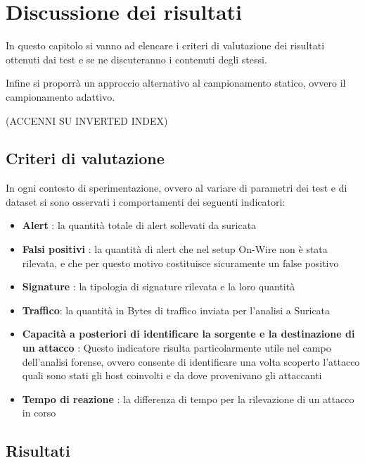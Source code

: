 \documentclass[12pt,a4paper,openright,twoside]{report}
\begin{document}
\chapter{Discussione dei risultati}                %
\lhead[\fancyplain{}{\bfseries\thepage}]{\fancyplain{}{\bfseries\rightmark}}

In questo capitolo si vanno ad elencare i criteri di valutazione dei risultati
ottenuti dai test e se ne discuteranno i contenuti degli stessi.

Infine si proporr\`a un approccio alternativo al campionamento statico, ovvero
il campionamento adattivo.

(ACCENNI SU INVERTED INDEX)

\section{Criteri di valutazione}
In ogni contesto di sperimentazione, ovvero al variare di parametri dei test e di
dataset si sono osservati i comportamenti dei seguenti indicatori:
\begin{itemize}
  \item {\bf Alert} : la quantit\`a totale di alert sollevati da suricata
  \item {\bf Falsi positivi} : la quantit\`a di alert che nel setup On-Wire
  non \`e stata rilevata, e che per questo motivo costituisce sicuramente un false positivo
  \item {\bf Signature} : la tipologia di signature rilevata e la loro quantit\`a
  \item {\bf Traffico}: la quantit\`a in Bytes di traffico inviata per l'analisi
  a Suricata
  \item{\bf Capacit\`a a posteriori di identificare la sorgente e la destinazione di un
  attacco} : Questo indicatore risulta particolarmente utile nel campo dell'analisi forense,
  ovvero consente di identificare una volta scoperto l'attacco quali sono stati gli
  host coinvolti e da dove provenivano gli attaccanti
  \item {\bf Tempo di reazione} : la differenza di tempo per la rilevazione di
  un attacco in corso
\end{itemize}

\section{Risultati}
\end{document}
